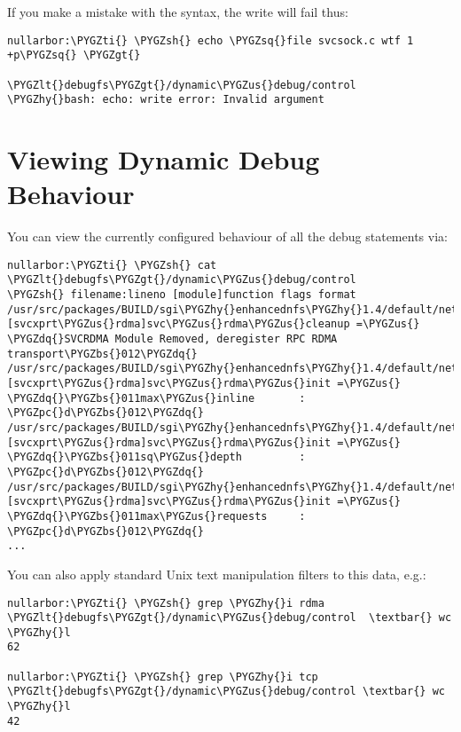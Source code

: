 \documentclass[a4paper,8pt,english]{sphinxmanual}
\def\PYGZbs{\char`\\}
\def\PYGZus{\char`\_}
\def\PYGZlt{\char`\<}
\def\PYGZgt{\char`\>}
\def\PYGZsh{\char`\#}
\def\PYGZpc{\char`\%}
\def\PYGZhy{\char`\-}
\def\PYGZsq{\char`\'}
\def\PYGZdq{\char`\"}
\def\PYGZti{\char`\~}
\renewcommand\PYGZsq{\textquotesingle}
\begin{document}
If you make a mistake with the syntax, the write will fail thus:

\begin{Verbatim}[commandchars=\\\{\}]
nullarbor:\PYGZti{} \PYGZsh{} echo \PYGZsq{}file svcsock.c wtf 1 +p\PYGZsq{} \PYGZgt{}
                              \PYGZlt{}debugfs\PYGZgt{}/dynamic\PYGZus{}debug/control
\PYGZhy{}bash: echo: write error: Invalid argument
\end{Verbatim}


\section{Viewing Dynamic Debug Behaviour}
\label{admin-guide/dynamic-debug-howto:viewing-dynamic-debug-behaviour}
You can view the currently configured behaviour of all the debug
statements via:

\begin{Verbatim}[commandchars=\\\{\}]
nullarbor:\PYGZti{} \PYGZsh{} cat \PYGZlt{}debugfs\PYGZgt{}/dynamic\PYGZus{}debug/control
\PYGZsh{} filename:lineno [module]function flags format
/usr/src/packages/BUILD/sgi\PYGZhy{}enhancednfs\PYGZhy{}1.4/default/net/sunrpc/svc\PYGZus{}rdma.c:323 [svcxprt\PYGZus{}rdma]svc\PYGZus{}rdma\PYGZus{}cleanup =\PYGZus{} \PYGZdq{}SVCRDMA Module Removed, deregister RPC RDMA transport\PYGZbs{}012\PYGZdq{}
/usr/src/packages/BUILD/sgi\PYGZhy{}enhancednfs\PYGZhy{}1.4/default/net/sunrpc/svc\PYGZus{}rdma.c:341 [svcxprt\PYGZus{}rdma]svc\PYGZus{}rdma\PYGZus{}init =\PYGZus{} \PYGZdq{}\PYGZbs{}011max\PYGZus{}inline       : \PYGZpc{}d\PYGZbs{}012\PYGZdq{}
/usr/src/packages/BUILD/sgi\PYGZhy{}enhancednfs\PYGZhy{}1.4/default/net/sunrpc/svc\PYGZus{}rdma.c:340 [svcxprt\PYGZus{}rdma]svc\PYGZus{}rdma\PYGZus{}init =\PYGZus{} \PYGZdq{}\PYGZbs{}011sq\PYGZus{}depth         : \PYGZpc{}d\PYGZbs{}012\PYGZdq{}
/usr/src/packages/BUILD/sgi\PYGZhy{}enhancednfs\PYGZhy{}1.4/default/net/sunrpc/svc\PYGZus{}rdma.c:338 [svcxprt\PYGZus{}rdma]svc\PYGZus{}rdma\PYGZus{}init =\PYGZus{} \PYGZdq{}\PYGZbs{}011max\PYGZus{}requests     : \PYGZpc{}d\PYGZbs{}012\PYGZdq{}
...
\end{Verbatim}

You can also apply standard Unix text manipulation filters to this
data, e.g.:

\begin{Verbatim}[commandchars=\\\{\}]
nullarbor:\PYGZti{} \PYGZsh{} grep \PYGZhy{}i rdma \PYGZlt{}debugfs\PYGZgt{}/dynamic\PYGZus{}debug/control  \textbar{} wc \PYGZhy{}l
62

nullarbor:\PYGZti{} \PYGZsh{} grep \PYGZhy{}i tcp \PYGZlt{}debugfs\PYGZgt{}/dynamic\PYGZus{}debug/control \textbar{} wc \PYGZhy{}l
42
\end{Verbatim}
\end{document}
